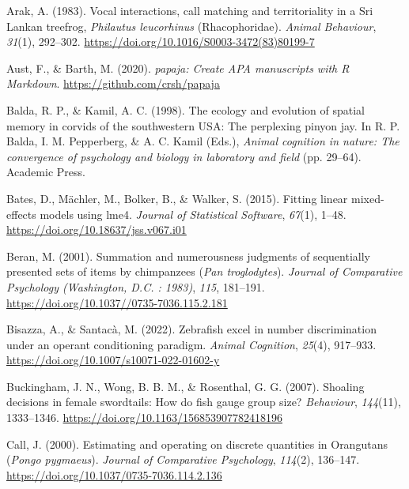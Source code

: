 \documentclass[
  ,pub,floatsintext]{apa6}
\newlength{\cslhangindent}
\newlength{\cslentryspacingunit} %
\newenvironment{CSLReferences}[2] %
 {%
  \setlength{\parindent}{0pt}
  \ifodd #1
  \let\oldpar\par
  \def\par{\hangindent=\cslhangindent\oldpar}
  \fi
  \setlength{\parskip}{#2\cslentryspacingunit}
 }%
 {}
\begin{document}
\begin{CSLReferences}{1}{0}
\leavevmode{}%
Arak, A. (1983). Vocal interactions, call matching and territoriality in a {Sri} {Lankan} treefrog, \emph{{Philautus} leucorhinus} ({Rhacophoridae}). \emph{Animal Behaviour}, \emph{31}(1), 292--302. \url{https://doi.org/10.1016/S0003-3472(83)80199-7}

\leavevmode{}%
Aust, F., \& Barth, M. (2020). \emph{{papaja}: {Create} {APA} manuscripts with {R Markdown}}. \url{https://github.com/crsh/papaja}

\leavevmode{}%
Balda, R. P., \& Kamil, A. C. (1998). The ecology and evolution of spatial memory in corvids of the southwestern USA: The perplexing pinyon jay. In R. P. Balda, I. M. Pepperberg, \& A. C. Kamil (Eds.), \emph{Animal cognition in nature: The convergence of psychology and biology in laboratory and field} (pp. 29--64). Academic Press.

\leavevmode{}%
Bates, D., Mächler, M., Bolker, B., \& Walker, S. (2015). Fitting linear mixed-effects models using {lme4}. \emph{Journal of Statistical Software}, \emph{67}(1), 1--48. \url{https://doi.org/10.18637/jss.v067.i01}

\leavevmode{}%
Beran, M. (2001). Summation and numerousness judgments of sequentially presented sets of items by chimpanzees (\emph{{Pan} troglodytes}). \emph{Journal of Comparative Psychology (Washington, D.C. : 1983)}, \emph{115}, 181--191. \url{https://doi.org/10.1037//0735-7036.115.2.181}

\leavevmode{}%
Bisazza, A., \& Santacà, M. (2022). Zebrafish excel in number discrimination under an operant conditioning paradigm. \emph{Animal Cognition}, \emph{25}(4), 917--933. \url{https://doi.org/10.1007/s10071-022-01602-y}

\leavevmode{}%
Buckingham, J. N., Wong, B. B. M., \& Rosenthal, G. G. (2007). Shoaling decisions in female swordtails: {How} do fish gauge group size? \emph{Behaviour}, \emph{144}(11), 1333--1346. \url{https://doi.org/10.1163/156853907782418196}

\leavevmode{}%
Call, J. (2000). Estimating and operating on discrete quantities in {Orangutans} (\emph{{Pongo} pygmaeus}). \emph{Journal of Comparative Psychology}, \emph{114}(2), 136--147. \url{https://doi.org/10.1037/0735-7036.114.2.136}


\end{CSLReferences}
\end{document}
